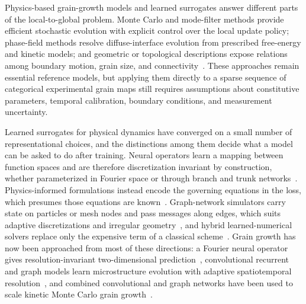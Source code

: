 \documentclass[proposalMode]{ufdissertation}
\begin{document}
Physics-based grain-growth models and learned surrogates answer different parts of the local-to-global problem. Monte Carlo and mode-filter methods provide efficient stochastic evolution with explicit control over the local update policy; phase-field methods resolve diffuse-interface evolution from prescribed free-energy and kinetic models; and geometric or topological descriptions expose relations among boundary motion, grain size, and connectivity~\cite{anderson1984kinetics,chen2002phasefield,krill2002phasefield,macpherson2007vonneumann,melville2024modefilter}. These approaches remain essential reference models, but applying them directly to a sparse sequence of categorical experimental grain maps still requires assumptions about constitutive parameters, temporal calibration, boundary conditions, and measurement uncertainty.

Learned surrogates for physical dynamics have converged on a small number of representational choices, and the distinctions among them decide what a model can be asked to do after training. Neural operators learn a mapping between function spaces and are therefore discretization invariant by construction, whether parameterized in Fourier space or through branch and trunk networks~\cite{li2021fno,lu2021deeponet,wang2021pideeponet}. Physics-informed formulations instead encode the governing equations in the loss, which presumes those equations are known~\cite{raissi2019pinn}. Graph-network simulators carry state on particles or mesh nodes and pass messages along edges, which suits adaptive discretizations and irregular geometry~\cite{sanchez2020gns,pfaff2021meshgraphnets,brandstetter2022mppde}, and hybrid learned-numerical solvers replace only the expensive term of a classical scheme~\cite{kochkov2021cfd}. Grain growth has now been approached from most of these directions: a Fourier neural operator gives resolution-invariant two-dimensional prediction~\cite{peivaste2025fno}, convolutional recurrent and graph models learn microstructure evolution with adaptive spatiotemporal resolution~\cite{yang2021convlstm,fan2024gnn}, and combined convolutional and graph networks have been used to scale kinetic Monte Carlo grain growth~\cite{tian2026scaling}.
\end{document}
